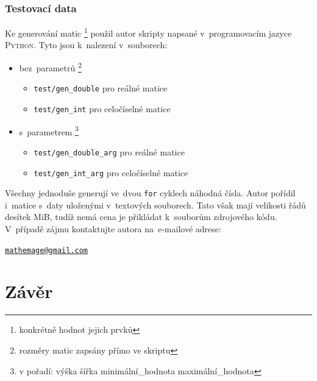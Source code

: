 \documentclass[11pt,a4paper]{article}
\theoremstyle{remark}
\begin{document}
\section{Testovací data}

Ke generování matic\thinspace%
\footnote{konkrétně hodnot jejich prvků}
použil autor skripty napsané v~programovacím jazyce \textsc{Python}.
Tyto jsou k~nalezení v~souborech:
\begin{itemize}
  \item bez~parametrů\thinspace%
    \footnote{rozměry matic zapsány přímo ve skriptu}
  \begin{itemize}
    \item \verb=test/gen_double= pro reálné matice
    \item \verb=test/gen_int= pro celočíselné matice
  \end{itemize}
  \item s~parametrem\thinspace%
    \footnote{v pořadí: výška šířka minimální\_hodnota maximální\_hodnota}
    \begin{itemize}
      \item \verb=test/gen_double_arg= pro reálné matice
      \item \verb=test/gen_int_arg= pro celočíselné matice
    \end{itemize}
\end{itemize}
Všechny jednoduše generují ve~dvou \verb=for= cyklech náhodná čísla.
Autor pořídil i~matice s~daty uloženými v~textových souborech.
Tato však mají velikosti řádů desítek MiB, tudíž nemá cena je přikládat
k~souborům zdrojového kódu.
V~případě zájmu kontaktujte autora na~e-mailové adrese: 

\begin{center}
\href{mailto:mathemage@gmail.com}{\nolinkurl{mathemage@gmail.com}}
\end{center}

\pagebreak

\part{Závěr}
\end{document}
